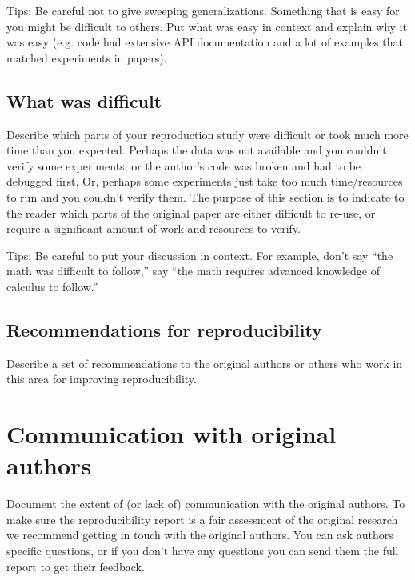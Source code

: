 \documentclass[11pt,a4paper]{article}
\begin{document}
Tips: Be careful not to give sweeping generalizations. Something that is easy for you might be difficult to others. Put what was easy in context and explain why it was easy (e.g. code had extensive API documentation and a lot of examples that matched experiments in papers). 

\subsection{What was difficult}
Describe which parts of your reproduction study were difficult or took much more time than you expected. Perhaps the data was not available and you couldn't verify some experiments, or the author's code was broken and had to be debugged first. Or, perhaps some experiments just take too much time/resources to run and you couldn't verify them. The purpose of this section is to indicate to the reader which parts of the original paper are either difficult to re-use, or require a significant amount of work and resources to verify. 

Tips: Be careful to put your discussion in context. For example, don't say ``the math was difficult to follow,'' say ``the math requires advanced knowledge of calculus to follow.'' 

\subsection{Recommendations for reproducibility}

Describe a set of recommendations to the original authors or others who work in this area for improving reproducibility.

\section{Communication with original authors}
Document the extent of (or lack of) communication with the original authors. To make sure the reproducibility report is a fair assessment of the original research we recommend getting in touch with the original authors. You can ask authors specific questions, or if you don't have any questions you can send them the full report to get their feedback.





\end{document}
